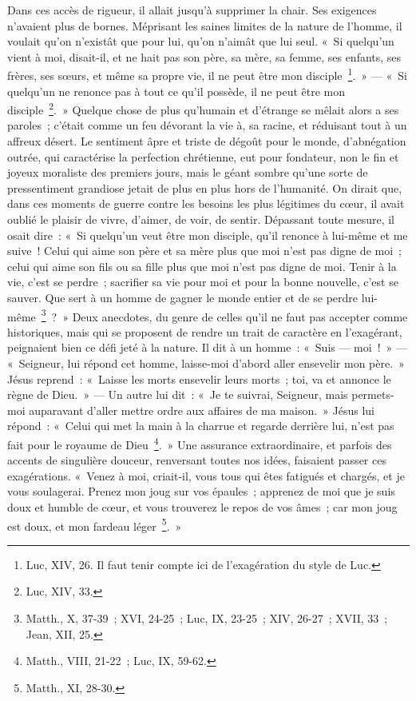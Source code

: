 \documentclass[french,twoside]{book} %
\begin{document}
Dans ces accès de rigueur, il allait jusqu’à supprimer la chair. Ses exigences n’avaient plus de bornes. Méprisant les saines limites de la nature de l’homme, il voulait qu’on n’existât que pour lui, qu’on n’aimât que lui seul. « Si quelqu’un vient à moi, disait-il, et ne hait pas son père, sa mère, sa femme, ses enfants, ses frères, ses sœurs, et même sa propre vie, il ne peut être mon disciple \footnote{Luc, XIV, 26. Il faut tenir compte ici de l’exagération du style de Luc.}. » — « Si quelqu’un ne renonce pas à tout ce qu’il possède, il ne peut être mon disciple \footnote{Luc, XIV, 33.}. » Quelque chose de plus qu’humain et d’étrange se mêlait alors a ses paroles ; c’était comme un feu dévorant la vie à, sa racine, et réduisant tout à un affreux désert. Le sentiment âpre et triste de dégoût pour le monde, d’abnégation outrée, qui caractérise la perfection chrétienne, eut pour fondateur, non le fin et joyeux moraliste des premiers jours, mais le géant sombre qu’une sorte de pressentiment grandiose jetait de plus en plus hors de l’humanité. On dirait que, dans ces moments de guerre contre les besoins les plus légitimes du cœur, il avait oublié le plaisir de vivre, d’aimer, de voir, de sentir. Dépassant toute mesure, il osait dire : « Si quelqu’un veut être mon disciple, qu’il renonce à lui-même et me suive ! Celui qui aime son père et sa mère plus que moi n’est pas digne de moi ; celui qui aime son fils ou sa fille plus que moi n’est pas digne de moi. Tenir à la vie, c’est se perdre ; sacrifier sa vie pour moi et pour la bonne nouvelle, c’est se sauver. Que sert à un homme de gagner le monde entier et de se perdre lui-même \footnote{Matth., X, 37-39 ; XVI, 24-25 ; Luc, IX, 23-25 ; XIV, 26-27 ; XVII, 33 ; Jean, XII, 25.} ? » Deux anecdotes, du genre de celles qu’il ne faut pas accepter comme historiques, mais qui se proposent de rendre un trait de caractère en l’exagérant, peignaient bien ce défi jeté à la nature. Il dit à un homme : « Suis — moi ! » — « Seigneur, lui répond cet homme, laisse-moi d’abord aller ensevelir mon père. » Jésus reprend : « Laisse les morts ensevelir leurs morts ; toi, va et annonce le règne de Dieu. » — Un autre lui dit : « Je te suivrai, Seigneur, mais permets-moi auparavant d’aller mettre ordre aux affaires de ma maison. » Jésus lui répond : « Celui qui met la main à la charrue et regarde derrière lui, n’est pas fait pour le royaume de Dieu \footnote{Matth., VIII, 21-22 ; Luc, IX, 59-62.}. » Une assurance extraordinaire, et parfois des accents de singulière douceur, renversant toutes nos idées, faisaient passer ces exagérations. « Venez à moi, criait-il, vous tous qui êtes fatigués et chargés, et je vous soulagerai. Prenez mon joug sur vos épaules ; apprenez de moi que je suis doux et humble de cœur, et vous trouverez le repos de vos âmes ; car mon joug est doux, et mon fardeau léger \footnote{Matth., XI, 28-30.}. »\par
\end{document}
